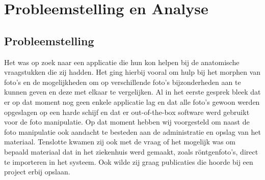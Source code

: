 \section{Probleemstelling en Analyse}
\label{Probleemstelling_en_analyse}
\subsection{Probleemstelling}
Het \casamproject was op zoek naar een applicatie die hun kon helpen bij de anatomische vraagstukken die zij hadden. 
Het ging hierbij vooral om hulp bij het morphen van foto's en de mogelijkheden om op verschillende foto's bijzonderheden aan te kunnen geven en deze met elkaar te vergelijken. 
Al in het eerste gesprek bleek dat er op dat moment nog geen enkele applicatie lag en dat alle foto's gewoon werden opgeslagen op een harde schijf en dat er out-of-the-box software werd gebruikt voor de foto manipulatie. 
Op dat moment hebben wij voorgesteld om naast de foto manipulatie ook aandacht te besteden aan de administratie en opslag van het materiaal.
Tenslotte kwamen zij ook met de vraag of het mogelijk was om bepaald materiaal dat in het ziekenhuis werd gemaakt, zoals r\"{o}ntgenfoto's, direct te importeren in het systeem. Ook wilde zij graag publicaties die hoorde bij een project erbij opslaan.

